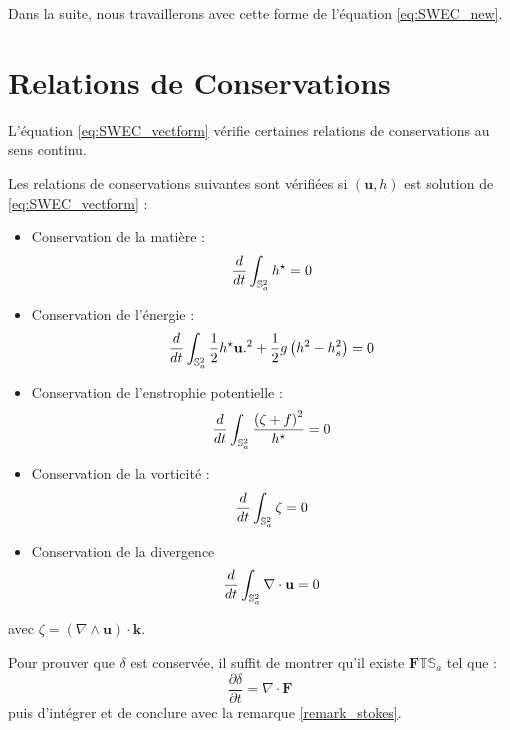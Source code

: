Dans la suite, nous travaillerons avec cette forme de l'équation \eqref{eq:SWEC_new}.


\section{Relations de Conservations}

L'équation \eqref{eq:SWEC_vectform} vérifie certaines relations de conservations au sens continu.

\begin{proposition}
Les relations de conservations suivantes sont vérifiées si $(\mathbf{u},h)$ est solution de \eqref{eq:SWEC_vectform} :
\begin{itemize}
\item Conservation de la matière :
\begin{equation}
\dfrac{d}{dt} \displaystyle\int_{\mathbb{S}_a^2} h^{\star} = 0
\label{eq:mass}
\end{equation}
 
\item Conservation de l'énergie :
\begin{equation}
\dfrac{d}{dt} \displaystyle\int_{\mathbb{S}_a^2} \dfrac{1}{2} h^{\star} \mathbf{u}.^2 + \dfrac{1}{2} g \left( h^2 - h_s^2 \right) = 0
\label{eq:energy}
\end{equation}

\item Conservation de l'enstrophie potentielle :
\begin{equation}
\dfrac{d}{dt} \displaystyle\int_{\mathbb{S}_a^2} \dfrac{\left( \zeta + f \right)^2}{h^{\star}} = 0
\label{eq:enstrophie}
\end{equation}

\item Conservation de la vorticité :
\begin{equation}
\dfrac{d}{dt} \displaystyle\int_{\mathbb{S}_a^2} \zeta = 0
\label{eq:vorticity}
\end{equation}

\item Conservation de la divergence
\begin{equation}
\dfrac{d}{dt} \displaystyle\int_{\mathbb{S}_a^2} \nabla \cdot \mathbf{u} = 0
\label{eq:divergence}
\end{equation}
\end{itemize}

avec $\zeta = \left( \nabla \wedge \mathbf{u} \right) \cdot \mathbf{k}$.
\end{proposition}

\begin{remarque}
Pour prouver que $\delta$ est conservée, il suffit de montrer qu'il existe $\mathbf{F} \mathbb{T} \mathbb{S}_a$ tel que :
$$
\dfrac{\partial \delta}{\partial t} = \nabla \cdot \mathbf{F}
$$
puis d'intégrer et de conclure avec la remarque \ref{remark_stokes}.
\label{rmq:int diverg nulle}
\end{remarque}

